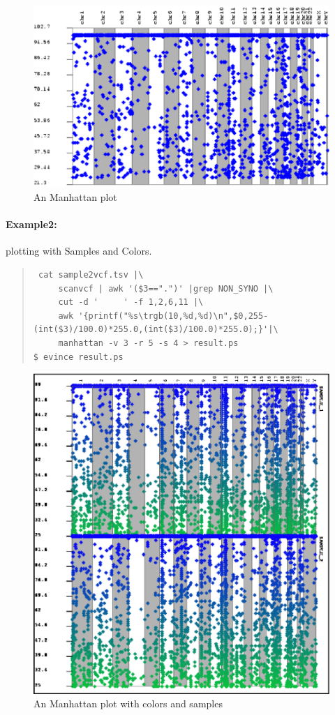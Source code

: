 \documentclass[12pt]{article}
\begin{document}
\begin{figure}
\includegraphics{manhattan.eps}
\caption{An Manhattan plot}
\end{figure}
\paragraph{Example2:}
plotting with Samples and Colors.
\begin{quote}
\begin{verbatim}
 cat sample2vcf.tsv |\
     scanvcf | awk '($3==".")' |grep NON_SYNO |\
     cut -d '     ' -f 1,2,6,11 |\
     awk '{printf("%s\trgb(10,%d,%d)\n",$0,255-(int($3)/100.0)*255.0,(int($3)/100.0)*255.0);}'|\
     manhattan -v 3 -r 5 -s 4 > result.ps
$ evince result.ps
\end{verbatim}
\end{quote}
\begin{figure}
\includegraphics[keepaspectratio=true,scale=1.0]{manhattan2.eps}
\caption{An Manhattan plot with colors and samples}
\end{figure}
\end{document}
